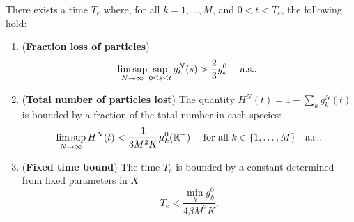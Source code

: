 \begin{lem}\label{mintime} There exists a time $T_e$ where, for all $k = 1, \dots, M$, and $0<t<T_e$, the following hold: \begin{enumerate}
\item (\textbf{Fraction loss of particles})  
\begin{equation}
\limsup_{N \rightarrow \infty} \sup_{0\le s\le t}g_k^N(s)>\frac 23g_k^0  \quad \hbox{ a.s.. }
\end{equation}
\item (\textbf{Total number of particles lost}) The quantity $H^{N}(t)=1-\sum_k g_k^N(t)$ is bounded by a fraction of the total number in each species:
\begin{equation}
\limsup_{N \rightarrow \infty}H^N(t)<\frac 1{3M^2K}\mu_k^0(\mathbb{R}^+) \quad \hbox{ for all } k \in \{1, \dots, M\} \quad \hbox{a.s..}
\end{equation}
\item
(\textbf{Fixed time bound}) The time $T_e$ is bounded by a constant determined from fixed parameters in $X$
\begin{equation}
T_e < \frac{\min_k g_k^0}{4\beta M^2K}.
\end{equation}
\end{enumerate}


\end{lem}

